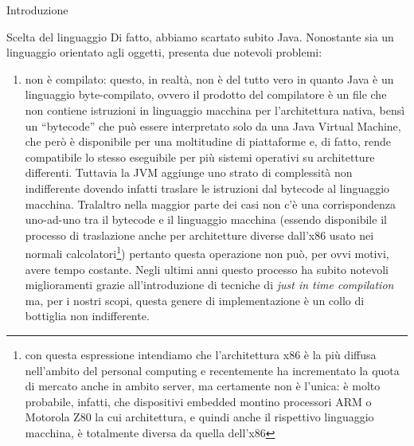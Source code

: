 \begin{chapter}{Introduzione}
\begin{section}{Scelta del linguaggio}
Di fatto, abbiamo scartato subito Java. Nonostante sia un linguaggio orientato
agli oggetti, presenta due notevoli problemi:

\begin{enumerate}
	\item non \`e compilato: questo, in realt\`a, non \`e del tutto vero in quanto
	      Java \`e un linguaggio byte-compilato, ovvero il prodotto del compilatore
				\`e un file che non contiene istruzioni in linguaggio macchina per 
				l'architettura nativa, bens\`i un ``bytecode'' che pu\`o essere
				interpretato solo da una Java Virtual Machine, che per\`o \`e disponibile
				per una moltitudine di piattaforme e, di fatto, rende compatibile lo stesso
				eseguibile per pi\`u sistemi operativi su architetture differenti. Tuttavia
				la JVM aggiunge uno strato di complessit\`a non indifferente dovendo infatti
				traslare le istruzioni dal bytecode al linguaggio macchina. Tralaltro nella
				maggior parte dei casi non c'\`e una corrispondenza uno-ad-uno tra il bytecode
				e il linguaggio macchina (essendo disponibile il processo di traslazione anche per
				architetture diverse dall'x86 usato nei normali calcolatori\footnote{con questa
				espressione intendiamo che l'architettura x86 \`e la pi\`u diffusa nell'ambito
				del personal computing e recentemente ha incrementato la quota di mercato anche
				in ambito server, ma certamente non \`e l'unica: \`e molto probabile, infatti,
				che dispositivi embedded montino processori ARM o Motorola Z80 la cui architettura,
				e quindi anche il rispettivo linguaggio macchina, \`e totalmente diversa da quella
				dell'x86}) pertanto questa operazione non pu\`o, per ovvi motivi, avere tempo costante.
				Negli ultimi anni questo processo ha subito notevoli miglioramenti grazie all'introduzione
				di tecniche di \textit{just in time compilation} \cite{367714} ma, per i
				nostri scopi, questa genere di implementazione \`e un collo di bottiglia non
				indifferente.


\end{enumerate}
\end{section}
\end{chapter}
